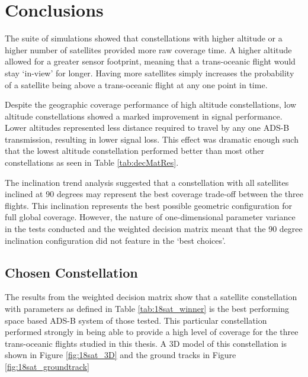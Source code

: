 \section{Conclusions}
The suite of simulations showed that constellations with higher altitude or a higher number of satellites provided more raw coverage time. A higher altitude allowed for a greater sensor footprint, meaning that a trans-oceanic flight would stay `in-view' for longer. Having more satellites simply increases the probability of a satellite being above a trans-oceanic flight at any one point in time.

Despite the geographic coverage performance of high altitude constellations, low altitude constellations showed a marked improvement in signal performance. Lower altitudes represented less distance required to travel by any one ADS-B transmission, resulting in lower signal loss. This effect was dramatic enough such that the lowest altitude constellation performed better than most other constellations as seen in Table \ref{tab:decMatRes}.

The inclination trend analysis suggested that a constellation with all satellites inclined at 90 degrees may represent the best coverage trade-off between the three flights. This inclination represents the best possible geometric configuration for full global coverage. However, the nature of one-dimensional parameter variance in the tests conducted and the weighted decision matrix meant that the 90 degree inclination configuration did not feature in the `best choices'. 
\subsection{Chosen Constellation}
The results from the weighted decision matrix show that a satellite constellation with parameters as defined in Table \ref{tab:18sat_winner} is the best performing space based ADS-B system of those tested. This particular constellation performed strongly in being able to provide a high level of coverage for the three trans-oceanic flights studied in this thesis. A 3D model of this constellation is shown in Figure \ref{fig:18sat_3D} and the ground tracks in Figure \ref{fig:18sat_groundtrack}

